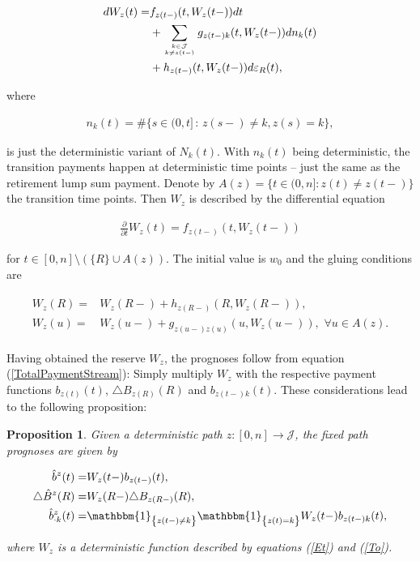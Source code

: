 \documentclass{article}
\newcommand{\1}[1]{\mathbbm{1}_{\left\lbrace #1 \right\rbrace}}
\theoremstyle{break}
\newtheorem{proposition}[definition]{Proposition}%
\theoremstyle{remark}
\numberwithin{equation}{section}
\begin{document}
\begin{align*}
	\begin{split}
		dW_z(t) =& f_{z(t-)}(t,W_z(t-)) dt \\
		&+ \sum_{k \in \mathcal{J} \atop k \neq z(t-)} g_{z(t-)k}(t,W_z(t-)) dn_{k}(t) \\
		&+ h_{z(t-)}(t,W_z(t-)) d \varepsilon_R(t),
	\end{split}
\end{align*}

where

\begin{align*}
	n_{k}(t) = \# \{ s \in (0,t] \, : \, z(s-) \neq k, z(s)=k \},
\end{align*}

is just the deterministic variant of $N_k(t)$. With $n_k(t)$ being deterministic, the transition payments happen at deterministic time points -- just the same as the retirement lump sum payment. Denote by $A(z) = \{ t \in (0,n] : z(t) \neq z(t-) \}$ the transition time points. Then $W_z$ is described by the differential equation

\begin{align} \label{Et}
	\frac{\partial}{\partial t} W_z(t) = f_{z(t-)}(t,W_z(t-))
\end{align}

for $t \in [0,n] \setminus \left( \{ R \} \cup A(z) \right)$. The initial value is $w_0$ and the gluing conditions are

\begin{align} \label{To}
\begin{split}
	W_z(R) =& W_z(R-) + h_{z(R-)}(R,W_z(R-)), \\
	W_z(u) =& W_z(u-) + g_{z(u-)z(u)}(u,W_z(u-)), \, \, \forall u \in A(z).
\end{split}
\end{align}

Having obtained the reserve $W_z$, the prognoses follow from equation (\ref{TotalPaymentStream}): Simply multiply $W_z$ with the respective payment functions $b_{z(t)}(t)$, $\triangle B_{z(R)}(R)$ and $b_{z(t-)k}(t)$. These considerations lead to the following proposition:

\begin{proposition} \label{FixedPath}
	Given a deterministic path $z: [0,n] \to \mathcal{J}$, the fixed path prognoses are given by
	
	\begin{align*}
		\hat{b}^{z}(t) =& W_z(t-)b_{z(t-)}(t) , \\
		\triangle \hat{B}^{z}(R) =& W_z(R-)\triangle B_{z(R-)}(R) , \\
		\hat{b}_{\cdot k}^{z}(t) =& \1{z(t-) \neq k} \1{z(t) = k} W_z(t-) b_{z(t-) k}(t),
	\end{align*}

where $W_z$ is a deterministic function described by equations (\ref{Et}) and (\ref{To}).
\end{proposition}
\end{document}
